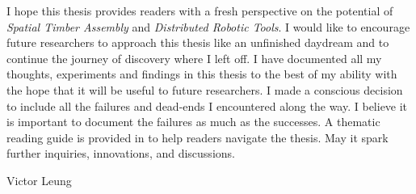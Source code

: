 \begin{adjustwidth}{20mm}{20mm}
I hope this thesis provides readers with a fresh perspective on the potential of \textit{Spatial Timber Assembly} and \textit{Distributed Robotic Tools}. I would like to encourage future researchers to approach this thesis like an unfinished daydream and to continue the journey of discovery where I left off. I have documented all my thoughts, experiments and findings in this thesis to the best of my ability with the hope that it will be useful to future researchers. I made a conscious decision to include all the failures and dead-ends I encountered along the way. I believe it is important to document the failures as much as the successes. A thematic reading guide is provided in  to help readers navigate the thesis. May it spark further inquiries, innovations, and discussions. 

Victor Leung

\end{adjustwidth}
